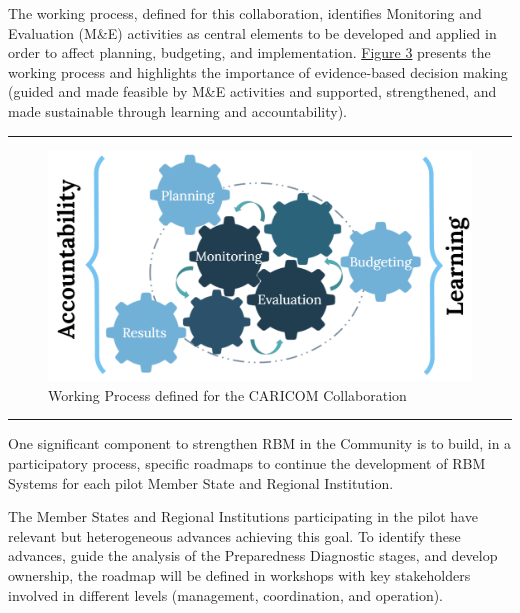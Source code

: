 \documentclass[
  10pt,
]{book}
\begin{document}
The working process, defined for this collaboration, identifies Monitoring and Evaluation (M\&E) activities as central elements to be developed and applied in order to affect planning, budgeting, and implementation. \protect\hyperlink{fig:figure3}{Figure 3} presents the working process and highlights the importance of evidence-based decision making (guided and made feasible by M\&E activities and supported, strengthened, and made sustainable through learning and accountability).

\begin{center}\rule{0.5\linewidth}{0.5pt}\end{center}

\begin{figure}

{\centering \includegraphics[width=1\linewidth]{./images/figure_3} 

}

\caption{Working Process defined for the CARICOM Collaboration}\label{fig:figure3}
\end{figure}

\begin{center}\rule{0.5\linewidth}{0.5pt}\end{center}

One significant component to strengthen RBM in the Community is to build, in a participatory process, specific roadmaps to continue the development of RBM Systems for each pilot Member State and Regional Institution.

The Member States and Regional Institutions participating in the pilot have relevant but heterogeneous advances achieving this goal. To identify these advances, guide the analysis of the Preparedness Diagnostic stages, and develop ownership, the roadmap will be defined in workshops with key stakeholders involved in different levels (management, coordination, and operation).
\end{document}
